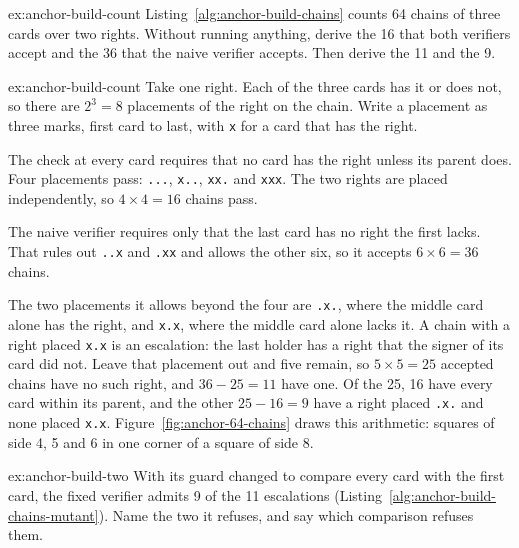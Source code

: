 \documentclass[11pt,a4paper]{article}
\theoremstyle{definition}
\begin{document}
\begin{pdexercise}[kind=Check,rating=1]{ex:anchor-build-count}
Listing~\ref{alg:anchor-build-chains} counts 64 chains of three cards over two rights. Without running anything, derive the 16 that both verifiers accept and the 36 that the naive verifier accepts. Then derive the 11 and the 9.
\end{pdexercise}
\begin{pdsolution}{ex:anchor-build-count}
Take one right. Each of the three cards has it or does not, so there are $2^3=8$ placements of the right on the chain. Write a placement as three marks, first card to last, with \texttt{x} for a card that has the right.

The check at every card requires that no card has the right unless its parent does. Four placements pass: \texttt{...}, \texttt{x..}, \texttt{xx.} and \texttt{xxx}. The two rights are placed independently, so $4\times4=16$ chains pass.

The naive verifier requires only that the last card has no right the first lacks. That rules out \texttt{..x} and \texttt{.xx} and allows the other six, so it accepts $6\times6=36$ chains.

The two placements it allows beyond the four are \texttt{.x.}, where the middle card alone has the right, and \texttt{x.x}, where the middle card alone lacks it. A chain with a right placed \texttt{x.x} is an escalation: the last holder has a right that the signer of its card did not. Leave that placement out and five remain, so $5\times5=25$ accepted chains have no such right, and $36-25=11$ have one. Of the 25, 16 have every card within its parent, and the other $25-16=9$ have a right placed \texttt{.x.} and none placed \texttt{x.x}. Figure~\ref{fig:anchor-64-chains} draws this arithmetic: squares of side 4, 5 and 6 in one corner of a square of side 8.
\end{pdsolution}
\begin{pdexercise}[kind=Trace,rating=2]{ex:anchor-build-two}
With its guard changed to compare every card with the first card, the fixed verifier admits 9 of the 11 escalations (Listing~\ref{alg:anchor-build-chains-mutant}). Name the two it refuses, and say which comparison refuses them.
\end{pdexercise}
\end{document}
